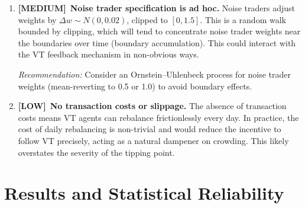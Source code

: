 \documentclass[12pt,a4paper]{article}
\newcommand{\MEDIUM}{\textbf{\textcolor{medorange}{[MEDIUM]}}}
\newcommand{\LOW}{\textbf{\textcolor{lowgreen}{[LOW]}}}
\begin{document}
\begin{enumerate}[leftmargin=2em,resume]
\textit{Recommendation:} Add a robustness check with heterogeneous VT agents (e.g., different target volatilities drawn from a distribution, different lookback windows).

\item \MEDIUM\ \textbf{Noise trader specification is ad hoc.} Noise traders adjust weights by $\Delta w \sim N(0, 0.02)$, clipped to $[0, 1.5]$. This is a random walk bounded by clipping, which will tend to concentrate noise trader weights near the boundaries over time (boundary accumulation). This could interact with the VT feedback mechanism in non-obvious ways.

\textit{Recommendation:} Consider an Ornstein--Uhlenbeck process for noise trader weights (mean-reverting to 0.5 or 1.0) to avoid boundary effects.

\item \LOW\ \textbf{No transaction costs or slippage.} The absence of transaction costs means VT agents can rebalance frictionlessly every day. In practice, the cost of daily rebalancing is non-trivial and would reduce the incentive to follow VT precisely, acting as a natural dampener on crowding. This likely overstates the severity of the tipping point.

\end{enumerate}

\section{Results and Statistical Reliability}
\label{sec:results}
\end{document}
